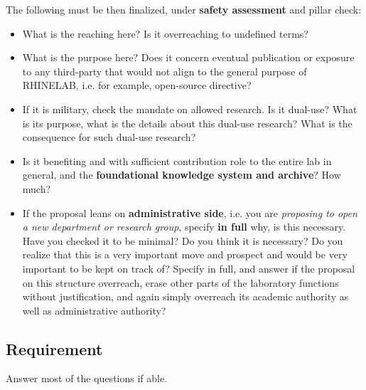 \documentclass[10pt,a4paper]{article}
\begin{document}
The following must be then finalized, under \textbf{safety assessment} and pillar check: 
\begin{itemize}
    \item What is the reaching here? Is it overreaching to undefined terms? 
    \item What is the purpose here? Does it concern eventual publication or exposure to any third-party that would not align to the general purpose of RHINELAB, i.e. for example, open-source directive?
    \item If it is military, check the mandate on allowed research. Is it dual-use? What is its purpose, what is the details about this dual-use research? What is the consequence for such dual-use research?
    \item Is it benefiting and with sufficient contribution role to the entire lab in general, and the \textbf{foundational knowledge system and archive}? How much?
    \item If the proposal leans on \textbf{administrative side}, i.e. you are \textit{proposing to open a new department or research group}, specify \textbf{in full} why, is this necessary. Have you checked it to be minimal? Do you think it is necessary? Do you realize that this is a very important move and prospect and would be very important to be kept on track of? Specify in full, and answer if the proposal on this structure overreach, erase other parts of the laboratory functions without justification, and again simply overreach its academic authority as well as administrative authority?
\end{itemize}

\subsection{Requirement}

Answer most of the questions if able. 
\end{document}

